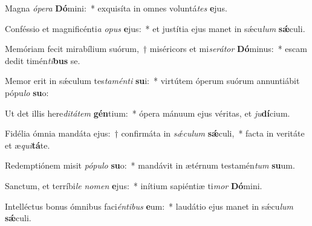 \item Magna \textit{ó}\textit{pe}\textit{ra} \textbf{Dó}mini:~* exquisíta in omnes voluntá\textit{tes} \textbf{e}jus.
\item Conféssio et magnificénti\textit{a} \textit{o}\textit{pus} \textbf{e}jus:~* et justítia ejus manet in sǽcu\textit{lum} \textbf{sǽ}culi.
\item Memóriam fecit mirabílium suórum,~† miséricors et mi\textit{se}\textit{rá}\textit{tor} \textbf{Dó}minus:~* escam dedit timén\textit{ti}\textbf{bus} se.
\item Memor erit in sǽculum tes\textit{ta}\textit{mén}\textit{ti} \textbf{su}i:~* virtútem óperum suórum annuntiábit pópu\textit{lo} \textbf{su}o:
\item Ut det illis here\textit{di}\textit{tá}\textit{tem} \textbf{gén}tium:~* ópera mánuum ejus véritas, et \textit{ju}\textbf{dí}cium.
\item Fidélia ómnia mandáta ejus:~† confirmáta in \textit{sǽ}\textit{cu}\textit{lum} \textbf{sǽ}culi,~* facta in veritáte et æ\textit{qui}\textbf{tá}te.
\item Redemptiónem misit \textit{pó}\textit{pu}\textit{lo} \textbf{su}o:~* mandávit in ætérnum testamén\textit{tum} \textbf{su}um.
\item Sanctum, et terríbi\textit{le} \textit{no}\textit{men} \textbf{e}jus:~* inítium sapiéntiæ ti\textit{mor} \textbf{Dó}mini.
\item Intelléctus bonus ómnibus faci\textit{én}\textit{ti}\textit{bus} \textbf{e}um:~* laudátio ejus manet in sǽcu\textit{lum} \textbf{sǽ}culi.
